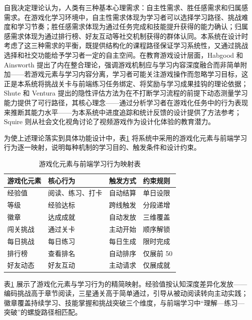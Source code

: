 自我决定理论认为，人类有三种基本心理需求：自主性需求、胜任感需求和归属感需求。在游戏化学习环境中，自主性需求体现为学习者可以选择学习路径、挑战难度和学习节奏；胜任感需求体现为通过任务完成和技能提升获得的能力确认；归属感需求体现为通过排行榜、好友互动等社交机制获得的群体认同。本系统在设计时考虑了这三种需求的平衡，既提供结构化的课程路径保证学习系统性，又通过挑战选择和社交功能给予学习者一定的自主空间。在教育游戏设计层面，Habgood 和 Ainsworth\cite{habgood2011} 提出了内在整合理论，强调游戏机制应与学习内容深度融合而非简单附加——若游戏元素与学习内容分离，学习者可能关注游戏操作而忽略学习目标，这正是本系统将挑战关卡与前端练习任务绑定、将奖励与学习成果挂钩的理论依据；Shute 和 Ventura\cite{shute2013} 提出的隐性评估方法为在不打断学习流程的前提下动态测量学习能力提供了可行路径，其核心理念——通过分析学习者在游戏化任务中的行为表现来推断其能力水平——为本系统中进度追踪和统计反馈的设计提供了方法参考；Squire\cite{squire2006} 则从社会文化视角讨论了视频游戏作为设计化体验的教育潜力。

为使上述理论落实到具体功能设计中，表\ref{tab:gamification-mapping} 将系统中采用的游戏化元素与前端学习行为逐一映射，说明每种机制的学习目的、触发条件和设计约束。

\begin{table}[htbp]
  \centering
  \caption{游戏化元素与前端学习行为映射表}
  \label{tab:gamification-mapping}
  \small
  \setlength{\tabcolsep}{4pt}
  \begin{tabular}{>{\raggedright\arraybackslash}p{1.5cm}>{\raggedright\arraybackslash}p{2.2cm}>{\raggedright\arraybackslash}p{2.0cm}>{\raggedright\arraybackslash}p{2.0cm}}
    \toprule
    游戏化元素 & 核心行为 & 触发方式 & 约束规则 \\
    \midrule
    经验值 & 阅读、练习、打卡 & 自动结算 & 单日设限 \\
    等级 & 经验达标 & 跨线触发 & 分段递增 \\
    徽章 & 达成成就 & 自动发放 & 三维覆盖 \\
    闯关挑战 & 通过关卡 & 主动开始 & 顺序解锁 \\
    每日挑战 & 每日练习 & 每日生成 & 限时完成 \\
    排行榜 & 查看排名 & 自动排序 & 仅展前 50 \\
    好友动态 & 好友互动 & 主动请求 & 仅展成就 \\
    \bottomrule
  \end{tabular}
\end{table}

表\ref{tab:gamification-mapping} 展示了游戏化元素与学习行为的精简映射。经验值按认知深度差异化发放——编码挑战高于章节阅读，三星通关高于简单通过，引导从被动阅读转向主动实践；徽章覆盖持续学习、技能掌握和挑战突破三个维度，与前端学习中“理解—练习—突破”的螺旋路径相匹配。

